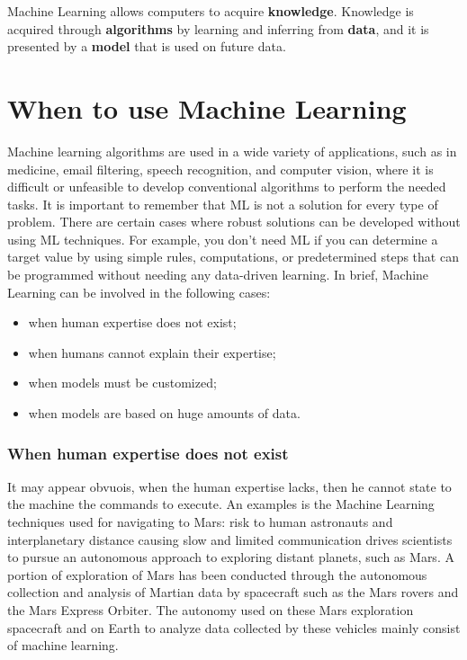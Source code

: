 Machine Learning allows computers to acquire \textbf{knowledge}. Knowledge is acquired through \textbf{algorithms} by learning and inferring from \textbf{data}, and it is presented by a \textbf{model} that is used on future data.

\section{When to use Machine Learning}
Machine learning algorithms are used in a wide variety of applications, such as in medicine, email filtering, speech recognition, and computer vision, where it is difficult or unfeasible to develop conventional algorithms to perform the needed tasks. It is important to remember that ML is not a solution for every type of problem. There are certain cases where robust solutions can be developed without using ML techniques. For example, you don't need ML if you can determine a target value by using simple rules, computations, or predetermined steps that can be programmed without needing any data-driven learning. In brief, Machine Learning can be involved in the following cases:
\begin{itemize}[topsep={0pt}, partopsep={0pt}]
    \item when human expertise does not exist;
    \item when humans cannot explain their expertise;
    \item when models must be customized;
    \item when models are based on huge amounts of data.
\end{itemize}

\subsubsection{When human expertise does not exist}
It may appear obvuois, when the human expertise lacks, then he cannot state to the machine the commands to execute. An examples is the Machine Learning techniques used for navigating to Mars: risk to human astronauts and interplanetary distance causing slow and limited communication drives scientists to pursue an autonomous approach to exploring distant planets, such as Mars. A portion of exploration of Mars has been conducted through the autonomous collection and analysis of Martian data by spacecraft such as the Mars rovers and the Mars Express Orbiter. The autonomy used on these Mars exploration spacecraft and on Earth to analyze data collected by these vehicles mainly consist of machine learning. 


